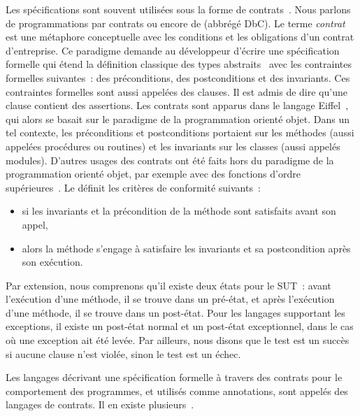 Les spécifications sont souvent utilisées sous la forme de {\strong
contrats}~. Nous parlons de programmations par contrats
ou encore de  (abbrégé DbC). Le terme {\em
contrat} est une métaphore conceptuelle avec les conditions et les obligations
d'un contrat d'entreprise. Ce paradigme demande au développeur d'écrire une
spécification formelle qui étend la définition classique des types
abstraits~ avec les contraintes formelles suivantes~: des
{\strong préconditions}, des {\strong postconditions} et des {\strong
invariants}. Ces contraintes formelles sont aussi appelées des {\strong
clauses}. Il est admis de dire qu'une clause contient des {\strong assertions}.
Les contrats sont apparus dans le langage Eiffel~, qui alors se
basait sur le paradigme de la programmation orienté objet. Dans un tel contexte,
les préconditions et postconditions portaient sur les méthodes (aussi appelées
procédures ou routines) et les invariants sur les classes (aussi appelés
modules). D'autres usages des contrats ont été faits hors du paradigme de la
programmation orienté objet, par exemple avec des fonctions d'ordre
supérieures~. Le  définit les
critères de conformité suivants~:

\begin{itemize}

\item si les invariants et la précondition de la méthode sont satisfaits avant
son appel,

\item alors la méthode s'engage à satisfaire les invariants et sa postcondition
après son exécution.

\end{itemize}

Par extension, nous comprenons qu'il existe deux états pour le SUT~: avant
l'exécution d'une méthode, il se trouve dans un {\strong pré-état}, et après
l'exécution d'une méthode, il se trouve dans un {\strong post-état}. Pour les
langages supportant les exceptions, il existe un post-état normal et un
post-état exceptionnel, dans le cas où une exception ait été levée. Par
ailleurs, nous disons que le test est un {\strong succès} si aucune clause n'est
violée, sinon le test est un {\strong échec}.

Les langages décrivant une spécification formelle à travers des contrats pour le
comportement des programmes, et utilisés comme annotations, sont appelés des
{\strong langages de contrats}. Il en existe plusieurs~.

